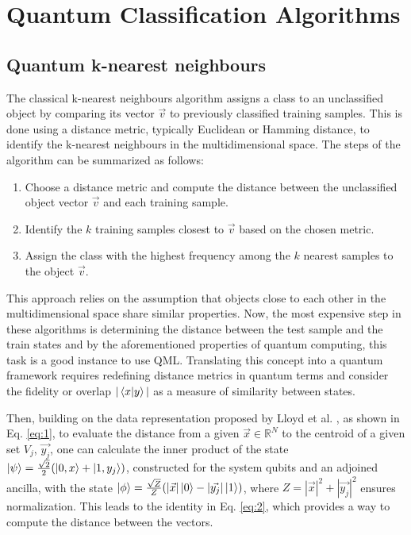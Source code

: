 \documentclass{article}
\begin{document}
\section{Quantum Classification Algorithms}
\subsection{Quantum k-nearest neighbours}
The classical k-nearest neighbours algorithm assigns a class to an unclassified object by comparing its vector $\vec{v}$ to previously classified training samples. This is done using a distance metric, typically Euclidean or Hamming distance, to identify the k-nearest neighbours in the multidimensional space. The steps of the algorithm can be summarized as follows:

\begin{enumerate}
    \item Choose a distance metric and compute the distance between the unclassified object vector $\vec{v}$ and each training sample.
    \item Identify the $k$ training samples closest to $\vec{v}$ based on the chosen metric.
    \item Assign the class with the highest frequency among the $k$ nearest samples to the object $\vec{v}$.
\end{enumerate}

This approach relies on the assumption that objects close to each other in the multidimensional space share similar properties. Now, the most expensive step in these algorithms is determining the distance between the test sample and the train states and by the aforementioned properties of quantum computing, this task is a good instance to use QML.
Translating this concept into a quantum framework requires redefining distance metrics in quantum terms and consider the fidelity or overlap $|\braket{x|y}|$ as a measure of similarity between states. 

Then, building on the data representation proposed by Lloyd et al. \cite{Lloyd2013}, as shown in Eq. \ref{eq:1}, to evaluate the distance from a given $\vec{x} \in \mathbb{R}^N$ to the centroid of a given set $V_j$, $\vec{y_j}$, one can calculate the inner product of the state $\ket{\psi} = \frac{\sqrt{2}}{2} (\ket{0, x} + \ket{1,y_j})$, constructed for the system qubits and an adjoined ancilla, with the state $\ket{\phi} = \frac{\sqrt{Z}}{Z}(|\vec{x}|\ket{0} - |\vec{y_j}|\ket{1})$, where $Z = |\vec{x}|^2 + |\vec{y_j}|^2$ ensures normalization. This leads to the identity in Eq. \ref{eq:2}, which provides a way to compute the distance between the vectors.
\end{document}
